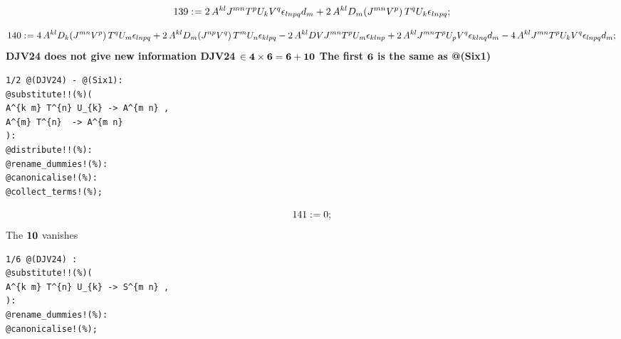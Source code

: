 \documentclass[11pt]{article}
\def\specialcolon{\mathrel{\mathop{:}}\hspace{-.5em}}
\begin{document}
\begin{dmath*}[compact, spread=2pt]
139\specialcolon{}= 2\, {A}^{k l} {J}^{m n} {T}^{p} {U}_{k} {V}^{q} {\epsilon}_{l n p q} {d}_{m} + 2\, {A}^{k l} {D}_{m}{({J}^{m n} {V}^{p})}\,  {T}^{q} {U}_{k} {\epsilon}_{l n p q};
\end{dmath*}


\begin{dmath*}[compact, spread=2pt]
140\specialcolon{}= 4\, {A}^{k l} {D}_{k}{({J}^{m n} {V}^{p})}\,  {T}^{q} {U}_{m} {\epsilon}_{l n p q} + 2\, {A}^{k l} {D}_{m}{({J}^{n p} {V}^{q})}\,  {T}^{m} {U}_{n} {\epsilon}_{k l p q} - 2\, {A}^{k l} DV {J}^{m n} {T}^{p} {U}_{m} {\epsilon}_{k l n p} + 2\, {A}^{k l} {J}^{m n} {T}^{p} {U}_{p} {V}^{q} {\epsilon}_{k l n q} {d}_{m} - 4\, {A}^{k l} {J}^{m n} {T}^{p} {U}_{k} {V}^{q} {\epsilon}_{l n p q} {d}_{m};
\end{dmath*}
\large \bf DJV24 does not give new information
DJV24 $\in \bf 4 \times  6 = 6+10  $
The first $\bf 6$ is the same as @(Six1)
{\color[named]{Blue}\begin{verbatim}
1/2 @(DJV24) - @(Six1):
@substitute!!(%)(
A^{k m} T^{n} U_{k} -> A^{m n} ,
A^{m} T^{n}  -> A^{m n}
):
@distribute!!(%):
@rename_dummies!(%):
@canonicalise!(%):
@collect_terms!(%);
\end{verbatim}}


\begin{dmath*}[compact, spread=2pt]
141\specialcolon{}= 0;
\end{dmath*}
The $\bf 10$ vanishes
{\color[named]{Blue}\begin{verbatim}
1/6 @(DJV24) :
@substitute!!(%)(
A^{k m} T^{n} U_{k} -> S^{m n} ,
):
@rename_dummies!(%):
@canonicalise!(%);
\end{verbatim}}
\end{document}
